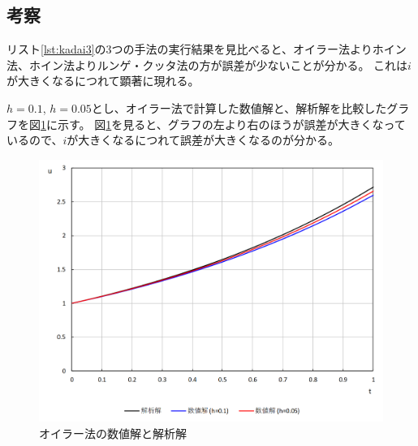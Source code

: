 \documentclass[a4j,titlepage]{jsarticle}
\begin{document}
\subsection{考察}
リスト\ref{lst:kadai3}の3つの手法の実行結果を見比べると、オイラー法よりホイン法、ホイン法よりルンゲ・クッタ法の方が誤差が少ないことが分かる。
これは$i$が大きくなるにつれて顕著に現れる。

$h = 0.1$, $h = 0.05$とし、オイラー法で計算した数値解と、解析解を比較したグラフを図\ref{fig:kadai3}に示す。
図\ref{fig:kadai3}を見ると、グラフの左より右のほうが誤差が大きくなっているので、$i$が大きくなるにつれて誤差が大きくなるのが分かる。

\begin{figure}[H]
  \centering
  \includegraphics[width=15cm]{kadai3.png}
  \caption{オイラー法の数値解と解析解}
  \label{fig:kadai3}
\end{figure}
\end{document}
